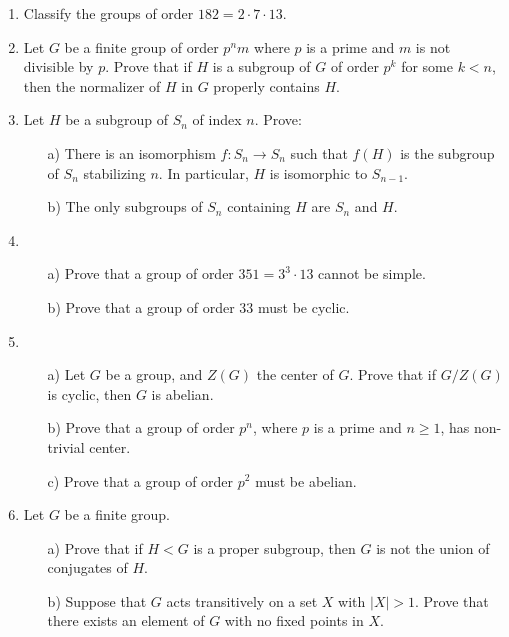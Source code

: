 \documentclass[11pt]{amsart}
\theoremstyle{plain}
\theoremstyle{definition}
\theoremstyle{remark}
\begin{document}
    \begin{enumerate}
        \item Classify the groups of order $182 = 2 \cdot 7 \cdot 13$.
        
        \item  Let $G$ be a finite group of order $p^nm$ where $p$ is a prime and $m$ is not divisible by $p$. Prove that if $H$ is a subgroup of $G$ of order $p^k$ for some $k<n$, then the normalizer of $H$ in $G$ properly contains $H$.

        
        \item Let $H$ be a subgroup of $S_n$ of index $n$. Prove:
        \begin{enumerate}
            \item[a)] There is an isomorphism $f: S_n \to S_n$ such that $f(H)$ is the subgroup of $S_n$ stabilizing $n$. In particular, $H$ is isomorphic to $S_{n-1}$.
            \item[b)] The only subgroups of $S_n$ containing $H$ are $S_n$ and $H$.
        \end{enumerate}
        
        \item \begin{itemize}
        \item[a)] Prove that a group of order $351=3^3\cdot 13$ cannot be simple.
        \item[b)] Prove that a group of order $33$ must be cyclic.
    \end{itemize}
        
        \item \begin{enumerate}
        \item[a)] Let $G$ be a group, and $Z(G)$ the center of $G$. Prove that if $G/Z(G)$ is cyclic, then $G$ is abelian.
        \item[b)] Prove that a group of order $p^n$, where $p$ is a prime and $n \geq 1$, has non-trivial center.
        \item[c)] Prove that a group of order $p^2$ must be abelian.
    \end{enumerate}
    
    \item Let $G$ be a finite group.
    \begin{enumerate}
        \item[a)] Prove that if $H < G$ is a proper subgroup, then $G$ is not the union of conjugates of $H$.
        \item[b)] Suppose that $G$ acts transitively on a set $X$ with $|X| > 1$. Prove that there exists an element of $G$ with no fixed points in $X$.
    \end{enumerate}
    

\end{enumerate}
\end{document}

